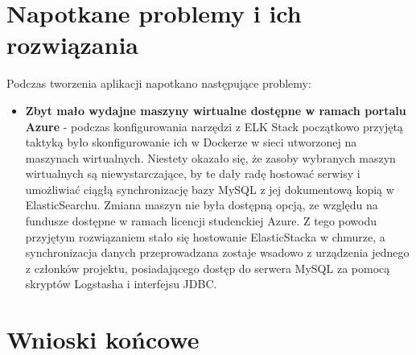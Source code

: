 \documentclass[]{article}
\begin{document}
    \section{Napotkane problemy i ich rozwiązania}
    Podczas tworzenia aplikacji napotkano następujące problemy:
    \begin{itemize}
        \item \textbf{Zbyt mało wydajne maszyny wirtualne dostępne w ramach portalu Azure} - podczas konfigurowania narzędzi z ELK Stack początkowo przyjętą taktyką było skonfigurowanie ich w Dockerze w sieci utworzonej na maszynach wirtualnych. Niestety okazało się, że zasoby wybranych maszyn wirtualnych są niewystarczające, by te dały radę hostować serwisy i umożliwiać ciągłą synchronizację bazy MySQL z jej dokumentową kopią w ElasticSearchu. Zmiana maszyn nie była dostępną opcją, ze względu na fundusze dostępne w ramach licencji studenckiej Azure. Z tego powodu przyjętym rozwiązaniem stało się hostowanie ElasticStacka w chmurze, a synchronizacja danych przeprowadzana zostaje wsadowo z urządzenia jednego z członków projektu, posiadającego dostęp do serwera MySQL za pomocą skryptów Logstasha i interfejsu JDBC.
    \end{itemize}
    \section{Wnioski końcowe}
\end{document}
